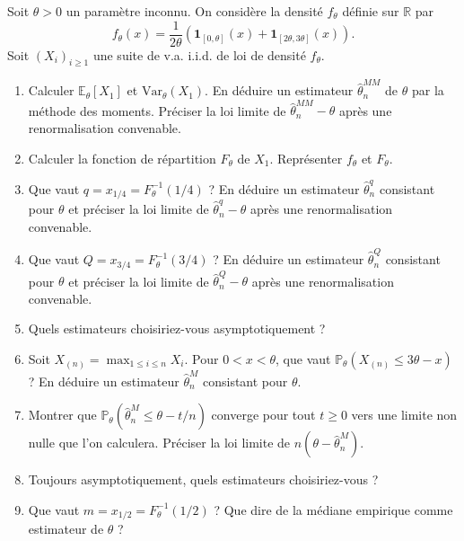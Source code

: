 \begin{mdframed}
\begin{exercice}
Soit $\theta > 0$ un paramètre inconnu. On considère la densité $f_\theta$ définie sur $\mathbb{R}$ par
\begin{equation*}
f_\theta(x) = \frac{1}{2\theta} \left( \mathbf{1}_{[0,\theta]}(x) + \mathbf{1}_{[2\theta,3\theta]}(x) \right).
\end{equation*}
Soit $(X_i)_{i \ge 1}$ une suite de v.a. i.i.d. de loi de densité $f_\theta$.

\begin{enumerate}
    \item Calculer $\mathbb{E}_\theta[X_1]$ et $\text{Var}_\theta(X_1)$. En déduire un estimateur $\hat{\theta}_n^{MM}$ de $\theta$ par la méthode des moments. Préciser la loi limite de $\hat{\theta}_n^{MM} - \theta$ après une renormalisation convenable.
    \item Calculer la fonction de répartition $F_\theta$ de $X_1$. Représenter $f_\theta$ et $F_\theta$.
    \item Que vaut $q = x_{1/4} = F_\theta^{-1}(1/4)$ ? En déduire un estimateur $\hat{\theta}_n^q$ consistant pour $\theta$ et préciser la loi limite de $\hat{\theta}_n^q - \theta$ après une renormalisation convenable.
    \item Que vaut $Q = x_{3/4} = F_\theta^{-1}(3/4)$ ? En déduire un estimateur $\hat{\theta}_n^Q$ consistant pour $\theta$ et préciser la loi limite de $\hat{\theta}_n^Q - \theta$ après une renormalisation convenable.
    \item Quels estimateurs choisiriez-vous asymptotiquement ?
    \item Soit $X_{(n)} = \max_{1 \le i \le n} X_i$. Pour $0 < x < \theta$, que vaut $\mathbb{P}_\theta(X_{(n)} \le 3\theta - x)$ ? En déduire un estimateur $\hat{\theta}_n^M$ consistant pour $\theta$.
    \item Montrer que $\mathbb{P}_\theta(\hat{\theta}_n^M \le \theta - t/n)$ converge pour tout $t \ge 0$ vers une limite non nulle que l'on calculera. Préciser la loi limite de $n(\theta - \hat{\theta}_n^M)$.
    \item Toujours asymptotiquement, quels estimateurs choisiriez-vous ?
    \item Que vaut $m = x_{1/2} = F_\theta^{-1}(1/2)$ ? Que dire de la médiane empirique comme estimateur de $\theta$ ?
\end{enumerate}
\end{exercice}
\end{mdframed}

\smallskip